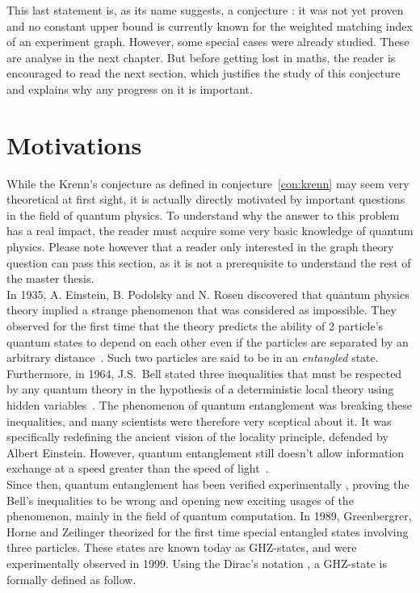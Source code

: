 This last statement is, as its name suggests, a conjecture : it was not yet proven and no constant upper bound is currently known for the weighted matching index of an experiment graph. However, some special cases were already studied. These are analyse in the next chapter. But before getting lost in maths, the reader is encouraged to read the next section, which justifies the study of this conjecture and explains why any progress on it is important.


\section{Motivations}
\label{sec:motivations}

While the Krenn's conjecture as defined in conjecture~\ref{con:krenn} may seem very theoretical at first sight, it is actually directly motivated by important questions in the field of quantum physics.
To understand why the answer to this problem has a real impact, the reader must acquire some very basic knowledge of quantum physics.
Please note however that a reader only interested in the graph theory question can pass this section, as it is not a prerequisite to understand the rest of the master thesis. \\

In 1935, A. Einstein, B. Podolsky and N. Rosen discovered that quantum physics theory implied a strange phenomenon that was considered as impossible.
They observed for the first time that the theory predicts the ability of 2 particle's quantum states to depend on each other even if the particles are separated by an arbitrary distance~\cite{EPR}.
Such two particles are said to be in an \textit{entangled} state.
Furthermore, in 1964, J.S.\ Bell stated three inequalities that must be respected by any quantum theory in the hypothesis of a deterministic local theory using hidden variables~\cite{bell1964}.
The phenomenon of quantum entanglement was breaking these inequalities, and many scientists were therefore very sceptical about it.
It was specifically redefining the ancient vision of the locality principle, defended by Albert Einstein.
However, quantum entanglement still doesn't allow information exchange at a speed greater than the speed of light~\cite{notFasterThanLight}.\\

Since then, quantum entanglement has been verified experimentally \cite{2012QuantumTA}, proving the Bell's inequalities to be wrong and opening new exciting usages of the phenomenon, mainly in the field of quantum computation. In 1989, Greenbergrer, Horne and Zeilinger theorized for the first time special entangled states involving three particles.\cite{GHZ} These states are known today as GHZ-states, and were experimentally observed in 1999.\cite{Bouwmeester_1999} Using the Dirac's notation \cite{dirac1939}, a GHZ-state is formally defined as follow. \\

